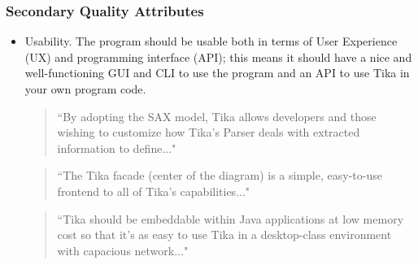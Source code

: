 \documentclass{article}
\begin{document}
\subsubsection{Secondary Quality Attributes}
\begin{itemize}
     \item Usability. The program should be usable both in terms of User Experience (UX) and programming interface (API); this means it should have a nice and well-functioning GUI and CLI to use the program and an API to use Tika in your own program code.
    
    \begin{quote}
        ``By adopting the SAX model, Tika allows developers and those wishing to customize how Tika’s Parser deals with extracted information to define..."
    \end{quote}
    
    \begin{quote}
        ``The Tika facade (center of the diagram) is a simple, easy-to-use frontend to all of Tika’s capabilities..."
    \end{quote}
     
    \begin{quote}
        ``Tika should be embeddable within Java applications at low memory cost so that it’s as easy to use Tika in a desktop-class environment with capacious network..."
    \end{quote}
 


\end{itemize}
\end{document}
